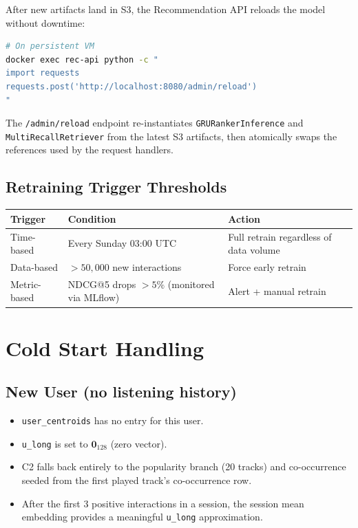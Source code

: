 \documentclass[11pt]{article}
\begin{document}
After new artifacts land in S3, the Recommendation API reloads the model without downtime:

\begin{lstlisting}[language=bash]
# On persistent VM
docker exec rec-api python -c "
import requests
requests.post('http://localhost:8080/admin/reload')
"
\end{lstlisting}

The \texttt{/admin/reload} endpoint re-instantiates \texttt{GRURankerInference} and
\texttt{MultiRecallRetriever} from the latest S3 artifacts, then atomically swaps the
references used by the request handlers.

\subsection{Retraining Trigger Thresholds}

\begin{longtable}{@{}llp{6cm}@{}}
\toprule
Trigger & Condition & Action \\
\midrule
Time-based & Every Sunday 03:00 UTC & Full retrain regardless of data volume \\
Data-based & $>50{,}000$ new interactions & Force early retrain \\
Metric-based & NDCG@5 drops $>5\%$ (monitored via MLflow) & Alert + manual retrain \\
\bottomrule
\end{longtable}

\section{Cold Start Handling}

\subsection{New User (no listening history)}

\begin{itemize}[leftmargin=1.5em]
  \item \texttt{user\_centroids} has no entry for this user.
  \item \texttt{u\_long} is set to $\mathbf{0}_{128}$ (zero vector).
  \item C2 falls back entirely to the popularity branch (20 tracks) and co-occurrence
        seeded from the first played track's co-occurrence row.
  \item After the first 3 positive interactions in a session, the session mean embedding
        provides a meaningful \texttt{u\_long} approximation.
\end{itemize}
\end{document}

